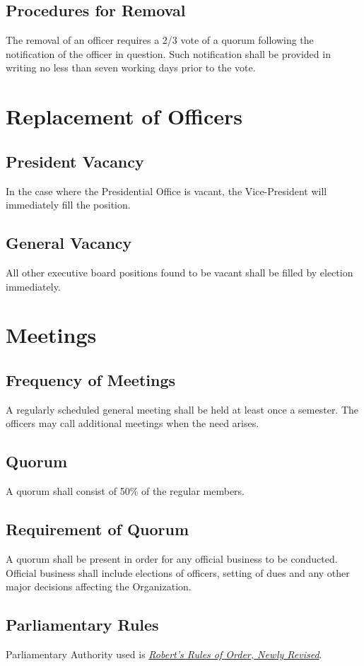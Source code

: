 \documentclass{article}
\begin{document}
\subsection{Procedures for Removal}
The removal of an officer requires a 2/3 vote of a quorum following the
notification of the officer in question. Such notification shall be provided in
writing no less than seven working days prior to the vote.

\section{Replacement of Officers}
\subsection{President Vacancy}
In the case where the Presidential Office is vacant, the Vice-President will immediately fill the position.
\subsection{General Vacancy}
All other executive board positions found to be vacant shall be filled by election immediately.

\section{Meetings}
\subsection{Frequency of Meetings}
A regularly scheduled general meeting shall be held at least once a semester. The officers may call additional meetings when the need arises.
\subsection{Quorum}
A quorum shall consist of 50\% of the regular members.
\subsection{Requirement of Quorum}
A quorum shall be present in order for any official business to be conducted.
Official business shall include elections of officers, setting of dues and any other major decisions affecting the Organization.
\subsection{Parliamentary Rules}
Parliamentary Authority used is \underline{\textit{Robert’s Rules of Order, Newly Revised}}.
\end{document}
